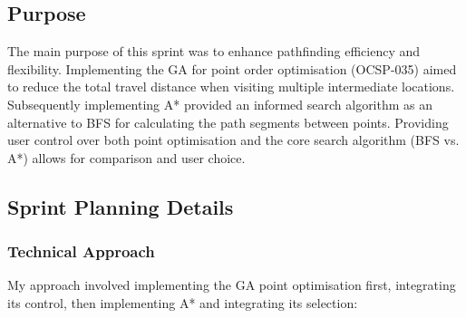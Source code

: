 \subsection{Purpose}
The main purpose of this sprint was to enhance pathfinding efficiency and flexibility. Implementing the GA for point order optimisation (OCSP-035) aimed to reduce the total travel distance when visiting multiple intermediate locations. Subsequently implementing A* provided an informed search algorithm as an alternative to BFS for calculating the path segments between points. Providing user control over both point optimisation and the core search algorithm (BFS vs. A*) allows for comparison and user choice.

\clearpage
\subsection{Sprint Planning Details}

\subsubsection{Technical Approach}
My approach involved implementing the GA point optimisation first, integrating its control, then implementing A* and integrating its selection:

